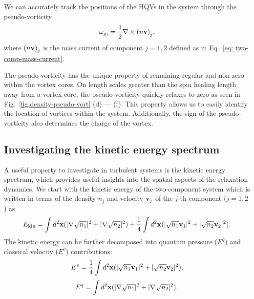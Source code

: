 We can accurately track the positions of the HQVs in the system through
the pseudo-vorticity~\cite{Villois2016}
\begin{equation}
    \omega_\mathrm{p_j} = \frac{1}{2}\nabla \times {(n\vb{v})}_j,
\end{equation}
where \({(n\vb{v})}_j\) is the mass current of component \(j=1, 2\) defined as
in Eq.~\eqref{eq: two-comp-mass-current}.

The pseudo-vorticity has the unique property of remaining regular and non-zero
within the vortex cores. On length scales greater than the spin healing length
away from a vortex core, the pseudo-vorticity quickly relaxes to zero as seen
in Fig.~\ref{fig:density-pseudo-vort} (d) --- (f).
This property allows us to easily identify the location of vortices within the
system.
Additionally, the sign of the pseudo-vorticity also determines the charge of
the vortex.

\subsection{Investigating the kinetic energy spectrum}
A useful property to investigate in turbulent systems is the kinetic energy
spectrum, which provides useful insights into the spatial aspects of the
relaxation dynamics.
We start with the kinetic energy of the two-component system which is written
in terms of the density \(n_j\) and velocity \(\vb{v}_j\) of the \(j\)-th
component (\( j=1,2 \)) as
\begin{equation}
    E_\mathrm{kin} = \int d^2\vb{x} (|\nabla\sqrt{n_1}|^2
    + |\nabla\sqrt{n_2}|^2)
    + \frac{1}{4}\int d^2\vb{x} (|\sqrt{n_1}\vb{v}_1|^2
    + |\sqrt{n_2}\vb{v}_2|^2).
\end{equation}
The kinetic energy can be further decomposed into quantum pressure
(\( E^q\)) and classical velocity (\(E^v\)) contributions:
\begin{equation}
    E^v = \frac{1}{4}\int d^2\vb{x} (|\sqrt{n_1}\vb{v}_1|^2
    + |\sqrt{n_2}\vb{v}_2|^2),
\end{equation}
\begin{equation}
    E^q = \int d^2\vb{x} (|\nabla\sqrt{n_1}|^2
    + |\nabla\sqrt{n_2}|^2).
\end{equation}

